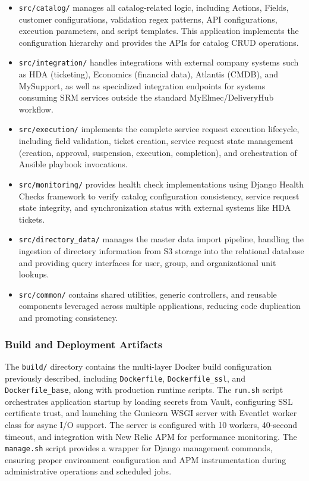 \begin{itemize}
\item \texttt{src/catalog/} manages all catalog-related logic, including Actions, Fields, customer configurations, validation regex patterns, API configurations, execution parameters, and script templates. This application implements the configuration hierarchy and provides the APIs for catalog CRUD operations.

\item \texttt{src/integration/} handles integrations with external company systems such as HDA (ticketing), Economics (financial data), Atlantis (CMDB), and MySupport, as well as specialized integration endpoints for systems consuming SRM services outside the standard MyElmec/DeliveryHub workflow.

\item \texttt{src/execution/} implements the complete service request execution lifecycle, including field validation, ticket creation, service request state management (creation, approval, suspension, execution, completion), and orchestration of Ansible playbook invocations.

\item \texttt{src/monitoring/} provides health check implementations using Django Health Checks framework to verify catalog configuration consistency, service request state integrity, and synchronization status with external systems like HDA tickets.

\item \texttt{src/directory\_data/} manages the master data import pipeline, handling the ingestion of directory information from S3 storage into the relational database and providing query interfaces for user, group, and organizational unit lookups.

\item \texttt{src/common/} contains shared utilities, generic controllers, and reusable components leveraged across multiple applications, reducing code duplication and promoting consistency.
\end{itemize}

\subsubsection{Build and Deployment Artifacts}
The \texttt{build/} directory contains the multi-layer Docker build configuration previously described, including \texttt{Dockerfile}, \texttt{Dockerfile\_ssl}, and \texttt{Dockerfile\_base}, along with production runtime scripts. The \texttt{run.sh} script orchestrates application startup by loading secrets from Vault, configuring SSL certificate trust, and launching the Gunicorn WSGI server with Eventlet worker class for async I/O support. The server is configured with 10 workers, 40-second timeout, and integration with New Relic APM for performance monitoring. The \texttt{manage.sh} script provides a wrapper for Django management commands, ensuring proper environment configuration and APM instrumentation during administrative operations and scheduled jobs.

